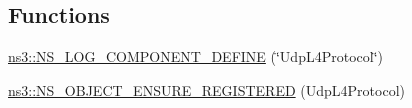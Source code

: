 \subsection*{Functions}
\begin{DoxyCompactItemize}
\item 
\hyperlink{namespacens3_ab3f2d8d75c311285c1ef0ce1f133388f}{ns3\+::\+N\+S\+\_\+\+L\+O\+G\+\_\+\+C\+O\+M\+P\+O\+N\+E\+N\+T\+\_\+\+D\+E\+F\+I\+NE} (\char`\"{}Udp\+L4\+Protocol\char`\"{})
\item 
\hyperlink{namespacens3_a29af52135fa1611dcb4a7278d64c62f5}{ns3\+::\+N\+S\+\_\+\+O\+B\+J\+E\+C\+T\+\_\+\+E\+N\+S\+U\+R\+E\+\_\+\+R\+E\+G\+I\+S\+T\+E\+R\+ED} (Udp\+L4\+Protocol)
\end{DoxyCompactItemize}
